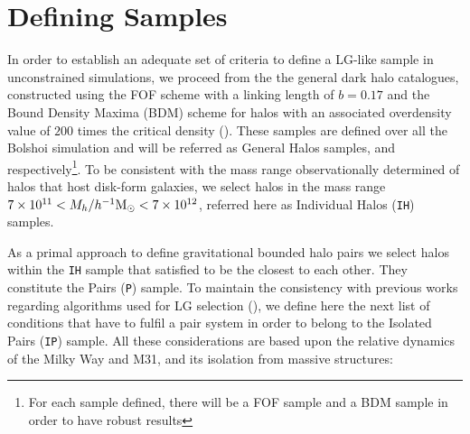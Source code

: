 \documentclass[usenatbib]{latex/mn2e}
\begin{document}
\section{Defining Samples}
\label{section:Def_Samples}



In order to establish an adequate set of criteria to define a LG-like 
sample in unconstrained simulations, we proceed from the the general dark 
halo catalogues, constructed using the FOF scheme with a linking length of 
$b=0.17$ and the Bound Density Maxima (BDM) scheme for halos with an 
associated overdensity value of $200$ times the critical density 
(). These samples are defined over all the Bolshoi 
simulation and will be referred as General Halos samples, \GHFOF and 
\GHBDM respectively\footnote{For each sample defined, there will be a FOF 
sample and a BDM sample in order to have robust results}. To be consistent 
with the mass range observationally determined of halos that host disk-form 
galaxies, we select halos in the mass range $7\times10^{11} < M_{h}/\hMsun 
< 7\times 10^{12}$, referred here as Individual Halos (\texttt{IH}) samples. 



As a primal approach to define gravitational bounded halo pairs we select 
halos within the \texttt{IH} sample that satisfied to be the closest to 
each other. They constitute the Pairs (\texttt{P}) sample. To maintain the 
consistency with previous works regarding algorithms used for LG selection 
(), we define here the next list of conditions 
that have to fulfil a pair system in order to belong to the Isolated Pairs 
(\texttt{IP}) sample. All these considerations are based upon the relative 
dynamics of the Milky Way and M31, and its isolation from massive 
structures:
\end{document}
